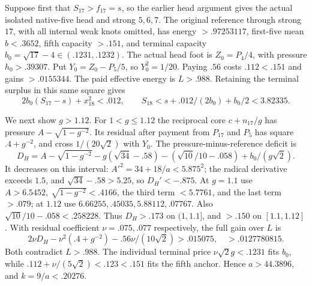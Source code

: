 \documentclass[11pt]{article}
\theoremstyle{definition}
\theoremstyle{remark}
\begin{document}
Suppose first that \(S_{17}>f_{17}=s\), so the earlier head argument
gives the actual isolated native-five head and strong \(5,6,7\).
The original reference through strong \(17\), with all internal
weak knots omitted, has energy \(>.97253117\),
first-five mean \(b<.3652\), fifth capacity \(>.151\), and
terminal capacity \(b_0=\sqrt{17}-4\in(.1231,.1232)\).
The actual head foot is \(Z_0=P_4/4\), with pressure
\(h_0>.39307\). Put \(Y_0=Z_0-P_5/5\), so \(Y_0^2=1/20\).
Paying \(.56\) costs \(.112<.151\) and gains \(>.0155344\).
The paid effective energy is \(L>.988\). Retaining the terminal
surplus in this same square gives
\[
 2b_0(S_{17}-s)+x_{18}^2<.012,\qquad
 S_{18}<s+.012/(2b_0)+b_0/2<3.82335 .
\]

We next show \(g>1.12\). For \(1<g\leq1.12\) the reciprocal core
\(c+n_{17}/g\) has pressure \(A-\sqrt{1-g^{-2}}\).
Its residual after payment from \(P_{17}\) and \(P_5\) has square
\(.4+g^{-2}\), and cross \(1/(20\sqrt2)\) with \(Y_0\).
The pressure-minus-reference deficit is
\[
 D_H=A-\sqrt{1-g^{-2}}-g(\sqrt{34}-.58)
       -(\sqrt{10}/10-.058)+b_0/(g\sqrt2).
\]
It decreases on this interval: \(A'^2=34+18/a<5.875^2\);
the radical derivative exceeds \(1.5\), and
\(\sqrt{34}-.58>5.25\), so \(D_H'<-.875\).
At \(g=1.1\) use \(A>6.5452,\ \sqrt{1-g^{-2}}<.4166\),
the third term \(<5.7761\), and the last term \(>.079\);
at \(1.12\) use \(6.66255,.45035,5.88112,.07767\).
Also \(\sqrt{10}/10-.058<.258228\).
Thus \(D_H>.173\) on \((1,1.1]\), and \(>.150\) on
\([1.1,1.12]\).
With residual coefficient \(\nu=.075,.077\) respectively, the
full gain over \(L\) is
\[
 2\nu D_H-\nu^2(.4+g^{-2})-.56\nu/(10\sqrt2)
 >.015075,\quad >.0127780815 .
\]
Both contradict \(L>.988\). The individual terminal price
\(\nu\sqrt2g<.1231\) fits \(b_0\), while
\(.112+\nu/(5\sqrt2)<.123<.151\) fits the fifth anchor.
Hence \(a>44.3896\), and \(k=9/a<.20276\).
\end{document}
